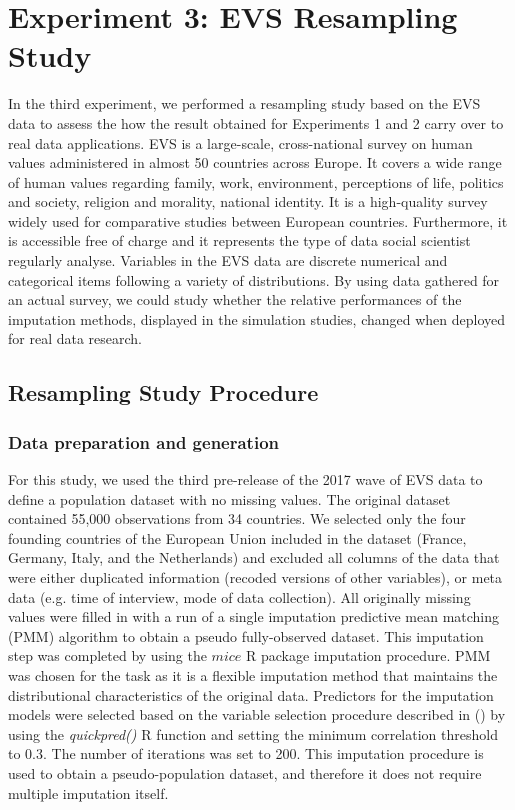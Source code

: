 \section{Experiment 3: EVS Resampling Study}

In the third experiment, we performed a resampling study based on the EVS data to assess the 
how the result obtained for Experiments 1 and 2 carry over to real data applications.
EVS is a large-scale, cross-national survey on human values administered in almost 50 countries
across Europe.
It covers a wide range of human values regarding family, work, environment, perceptions of 
life, politics and society, religion and morality, national identity.
It is a high-quality survey widely used for comparative studies between European countries.
Furthermore, it is accessible free of charge and it represents the type of data social scientist 
regularly analyse.
Variables in the EVS data are discrete numerical and categorical items following a 
variety of distributions.
By using data gathered for an actual survey, we could study whether the relative performances of 
the imputation methods, displayed in the simulation studies, changed when deployed for real data 
research.

\subsection{Resampling Study Procedure} \label{resProc}

\subsubsection{Data preparation and generation}
	For this study, we used the third pre-release of the 2017 wave of EVS data \citep{EVS:2017} to define
	a population dataset with no missing values.
	The original dataset contained 55,000 observations from 34 countries.
	We selected only the four founding countries of the European Union included in the dataset (France, Germany,
	Italy, and the Netherlands) and excluded all columns of the data that were either duplicated
	information (recoded versions of other variables), or meta data (e.g. time of interview,
	mode of data collection). 
	All originally missing values were filled in with a run of a single imputation predictive mean matching (PMM) 
	algorithm to obtain a pseudo fully-observed dataset.
	This imputation step was completed by using the $mice$ R package imputation procedure.
	PMM was chosen for the task as it is a flexible imputation method that maintains the distributional 
	characteristics of the original data.
	Predictors for the imputation models were selected based on the variable selection procedure described in
	\citeauthor{vanBuurenEtAl:1999} (\citeyear[pp. 687–688]{vanBuurenEtAl:1999}) by using the \emph{quickpred()}
	R function and setting the minimum correlation threshold to 0.3.
	The number of iterations was set to 200.
	This imputation procedure is used to obtain a pseudo-population dataset, and therefore it does not require
	multiple imputation itself.

